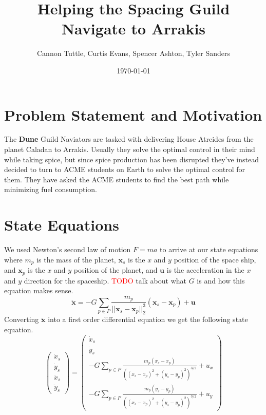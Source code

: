 \documentclass[11pt]{amsart}
\begin{document}
\title{Helping the Spacing Guild Navigate to Arrakis}
\author{Cannon Tuttle, Curtis Evans, Spencer Ashton, Tyler Sanders}

\date{\today}

\begin{abstract}
    
\end{abstract}

\maketitle

\section{Problem Statement and Motivation}
The \textbf{Dune} Guild Naviators are tasked with delivering House Atreides from the planet Caladan to Arrakis. Usually they solve the optimal control in their mind while taking spice, but since spice production
has been disrupted they've instead decided to turn to ACME students on Earth to solve the optimal control for them. They have asked the ACME students to find the best path while minimizing fuel consumption.


\section{State Equations}
We used Newton's second law of motion $F=ma$ to arrive at our state equations where $m_p$ is the mass of the planet, $\mathbf{x}_s$ is the $x$ and $y$ position of the space ship, and $\mathbf{x}_p$ is the $x$
and $y$ position of the planet, and $\mathbf{u}$ is the acceleration in the $x$ and $y$ direction for the spaceship. \textcolor{red}{TODO} talk about what $G$ is and how this equation makes sense.
\[\ddot{\mathbf{x}} = -G\sum_{p\in{P}}^{}\frac{m_p}{||\mathbf{x}_s-\mathbf{x}_p||_2^3}(\mathbf{x}_s-\mathbf{x}_p) + \mathbf{u}\]
Converting $\ddot{\mathbf{x}}$ into a first order differential equation we get the following state equation. 
\[\begin{pmatrix}
    \dot{x}_s \\
    \dot{y}_s \\
    \ddot{x}_s\\
    \ddot{y}_s 
\end{pmatrix} = \begin{pmatrix}
    \dot{x}_s \\
    \dot{y}_s \\
    -G\sum_{p\in{P}}^{}\frac{m_p(x_s - x_p)}{((x_s-x_p)^2+(y_s-y_p)^2)^{3/2}} + u_x \\
    -G\sum_{p\in{P}}^{}\frac{m_p(y_s - y_p)}{((x_s-x_p)^2+(y_s-y_p)^2)^{3/2}} + u_y
\end{pmatrix}\]
\end{document}
